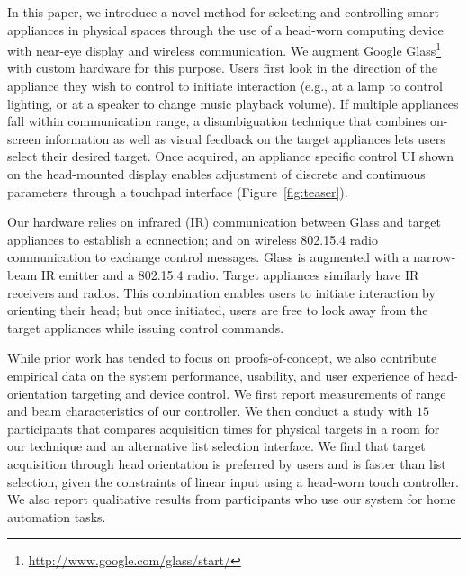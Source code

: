 In this paper, we introduce a novel method for selecting and controlling smart appliances in physical spaces through the use of a head-worn computing device with near-eye display and wireless communication. We augment Google Glass\footnote{\url{http://www.google.com/glass/start/}} with custom hardware for this purpose. Users first look in the direction of the appliance they wish to control to initiate interaction (e.g., at a lamp to control lighting, or at a speaker to change music playback volume).  If multiple appliances fall within communication range, a disambiguation technique that combines on-screen information as well as visual feedback on the target appliances lets users select their desired target. Once acquired, an appliance specific control UI shown on the head-mounted display enables adjustment of discrete and continuous parameters through a touchpad interface (Figure~\ref{fig:teaser}).

Our hardware relies on infrared (IR) communication between Glass and target appliances to establish a connection; and on wireless 802.15.4 radio communication to exchange control messages.  Glass is augmented with a narrow-beam IR emitter and a 802.15.4 radio. Target appliances similarly have IR receivers and radios. This combination enables users to initiate interaction by orienting their head; but once initiated, users are free to look away from the target appliances while issuing control commands.

While prior work has tended to focus on proofs-of-concept, we also contribute empirical data on the system performance, usability, and user experience of head-orientation targeting and device control. We first report measurements of range and beam characteristics of our controller. We then conduct a study with $15$ participants that compares acquisition times for physical targets in a room for our technique and an alternative list selection interface. We find that target acquisition through head orientation is preferred by users and is faster than list selection, given the constraints of linear input using a head-worn touch controller. We also report qualitative results from participants who use our system for home automation tasks.






